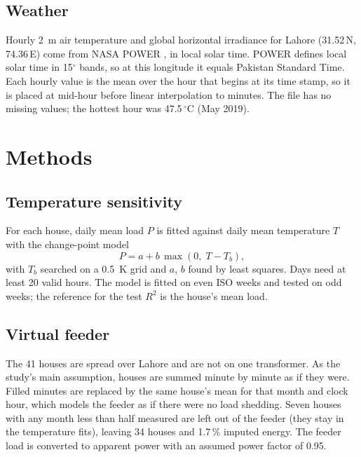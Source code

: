 \documentclass[conference]{IEEEtran}
\begin{document}
\subsection{Weather}
Hourly 2~m air temperature and global horizontal irradiance for Lahore
(31.52\,N, 74.36\,E) come from NASA POWER \cite{nasapower}, in local solar
time. POWER defines local solar time in 15$^\circ$ bands, so at this longitude
it equals Pakistan Standard Time. Each hourly value is the mean over the hour
that begins at its time stamp, so it is placed at mid-hour before linear
interpolation to minutes. The file has no missing values; the hottest hour
was 47.5\,$^\circ$C (May 2019).

\section{Methods}
\subsection{Temperature sensitivity}
For each house, daily mean load $P$ is fitted against daily mean temperature
$T$ with the change-point model \cite{kissock2003}
\begin{equation}
P = a + b\,\max(0,\;T - T_b),
\end{equation}
with $T_b$ searched on a 0.5~K grid and $a$, $b$ found by least squares. Days
need at least 20 valid hours. The model is fitted on even ISO weeks and tested
on odd weeks; the reference for the test $R^2$ is the house's mean load.

\subsection{Virtual feeder}
The 41 houses are spread over Lahore and are not on one transformer. As the
study's main assumption, houses are summed minute by minute as if they were.
Filled minutes are replaced by the same house's mean for that month and clock
hour, which models the feeder as if there were no load shedding. Seven houses
with any month less than half measured are left out of the feeder (they stay
in the temperature fits), leaving 34 houses and 1.7\,\% imputed energy. The
feeder load is converted to apparent power with an assumed power factor of
0.95.
\end{document}
